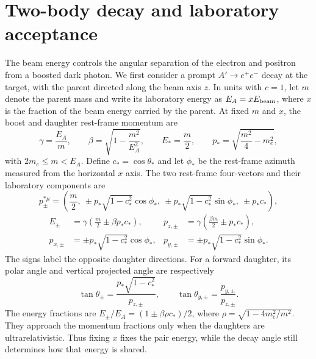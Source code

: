 \section{Two-body decay and laboratory acceptance}
\label{v571:kinematics}

The beam energy controls the angular separation of the electron and positron
from a boosted dark photon.  We first consider a prompt $A'\to e^+e^-$ decay
at the target, with the parent directed along the beam axis $z$.  In units with
$c=1$, let $m$ denote the parent mass and write its laboratory energy as
$E_A=xE_{\rm beam}$, where $x$ is the fraction of the beam energy carried by
the parent.  At fixed $m$ and $x$, the boost and daughter rest-frame momentum are
\begin{equation}
  \gamma=\frac{E_A}{m},\qquad
  \beta=\sqrt{1-\frac{m^2}{E_A^2}},\qquad
  E_* = \frac{m}{2},\qquad
  p_* = \sqrt{\frac{m^2}{4}-m_e^2},
  \label{v571:boost}
\end{equation}
with $2m_e\leq m<E_A$.  Define $c_*=\cos\theta_*$ and let $\phi_*$ be the
rest-frame azimuth measured from the horizontal $x$ axis.  The two rest-frame
four-vectors and their laboratory components are
\begin{equation}
  p_{\pm}^{*\mu}
    =\left(\frac m2,\ \pm p_*\sqrt{1-c_*^2}\cos\phi_*,\
       \pm p_*\sqrt{1-c_*^2}\sin\phi_*,\ \pm p_*c_*\right),
       \label{v571:rest-vectors}
\end{equation}
\begin{align}
  E_\pm&=\gamma\left(\frac m2\pm\beta p_*c_*\right),&
  p_{z,\pm}&=\gamma\left(\frac{\beta m}{2}\pm p_*c_*\right),
       \label{v571:lab-vectors}\\
  p_{x,\pm}&=\pm p_*\sqrt{1-c_*^2}\cos\phi_*,&
  p_{y,\pm}&=\pm p_*\sqrt{1-c_*^2}\sin\phi_* .
       \label{v571:transverse-vectors}
\end{align}
The signs label the opposite daughter directions.  For a forward daughter,
its polar angle and vertical projected angle are respectively
\begin{equation}
  \tan\theta_\pm=\frac{p_*\sqrt{1-c_*^2}}{p_{z,\pm}},\qquad
  \tan\theta_{y,\pm}=\frac{p_{y,\pm}}{p_{z,\pm}}.
  \label{v571:angles}
\end{equation}
The energy fractions are $E_\pm/E_A=(1\pm\beta\rho c_*)/2$, where
$\rho=\sqrt{1-4m_e^2/m^2}$.  They approach the momentum fractions only when
the daughters are ultrarelativistic.  Thus fixing $x$ fixes the pair energy,
while the decay angle still determines how that energy is shared.

